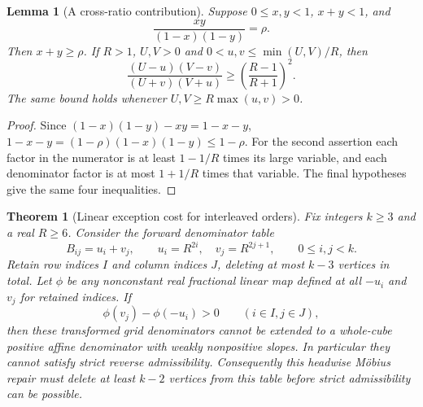 \documentclass[11pt]{article}
\newtheorem{lemma}{Lemma}
\newtheorem{theorem}{Theorem}
\begin{document}
\begin{lemma}[A cross-ratio contribution]
Suppose $0\leq x,y<1$, $x+y<1$, and
\[
 \frac{xy}{(1-x)(1-y)}=\rho.
\]
Then $x+y\geq\rho$. If $R>1$, $U,V>0$ and
$0<u,v\leq\min(U,V)/R$, then
\[
 \frac{(U-u)(V-v)}{(U+v)(V+u)}
 \geq\left(\frac{R-1}{R+1}\right)^2.
 \tag{2}
\]
The same bound holds whenever $U,V\geq R\max(u,v)>0$.
\end{lemma}
\begin{proof}
Since $(1-x)(1-y)-xy=1-x-y$,
$1-x-y=(1-\rho)(1-x)(1-y)\leq1-\rho$.
For the second assertion each factor in the numerator is at least
$1-1/R$ times its large variable, and each denominator factor is at
most $1+1/R$ times that variable. The final hypotheses give the same
four inequalities.
\end{proof}

\begin{theorem}[Linear exception cost for interleaved orders]
Fix integers $k\geq3$ and a real $R\geq6$. Consider the forward
denominator table
\[
 B_{ij}=u_i+v_j,\qquad
 u_i=R^{2i},\quad v_j=R^{2j+1},\qquad 0\leq i,j<k.
\]
Retain row indices $I$ and column indices $J$, deleting at most $k-3$
vertices in total. Let $\phi$ be any nonconstant real fractional linear
map defined at all $-u_i$ and $v_j$ for retained indices. If
\[
 \phi(v_j)-\phi(-u_i)>0\qquad(i\in I,j\in J),
\]
then these transformed grid denominators cannot be extended to a
whole-cube positive affine denominator with weakly nonpositive slopes.
In particular they cannot satisfy strict reverse admissibility.
Consequently this headwise M\"obius repair must delete at least $k-2$
vertices from this table before strict admissibility can be possible.
\end{theorem}
\end{document}
